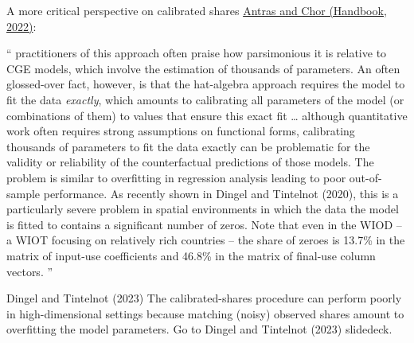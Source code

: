 \documentclass[11pt,notes=hide,aspectratio=169]{beamer}
\begin{document}
\begin{frame}{A more critical perspective on calibrated shares}
\href{https://doi.org/10.1016/bs.hesint.2022.02.005}{Antras and Chor (Handbook, 2022)}:\\
{\small
``
practitioners of this approach often praise how parsimonious it is relative to CGE models, which involve the estimation of thousands of parameters. An often glossed-over fact, however, is that the hat-algebra approach requires the model to fit the data \textit{exactly}, which amounts to calibrating all parameters of the model (or combinations of them) to values that ensure this exact fit
\dots
although quantitative work often requires strong assumptions on functional forms, calibrating thousands of parameters to fit the data exactly can be problematic for the validity or reliability of the counterfactual predictions of those models. The problem is similar to overfitting in regression analysis leading to poor out-of-sample performance. As recently shown in Dingel and Tintelnot (2020), this is a particularly severe problem in spatial environments in which the data the model is fitted to contains a significant number of zeros. Note that even in the WIOD -- a WIOT focusing on relatively rich countries -- the share of zeroes is 13.7\% in the matrix of input-use coefficients and 46.8\% in the matrix of final-use column vectors.%
''\par}
\end{frame}
\begin{frame}{Dingel and Tintelnot (2023)}
The calibrated-shares procedure can perform poorly in high-dimensional settings because matching (noisy) observed shares amount to overfitting the model parameters.
Go to Dingel and Tintelnot (2023) slidedeck.
\end{frame}
\end{document}
